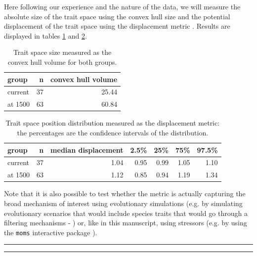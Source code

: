 \documentclass[12pt,letterpaper]{article}
\begin{document}
Here following our experience and the nature of the data, we will measure the absolute size of the trait space using the convex hull size and the potential displacement of the trait space using the displacement metric \citep{guillerme2020shifting}.
Results are displayed in tables \ref{Tab:results_convhull} and \ref{Tab:displacement}.

\begin{table}[ht]
\centering
\begin{tabular}{lrr}
  \hline
 group & n & convex hull volume \\ 
  \hline
 current &  37 & 25.44 \\ 
 at 1500 &  63 & 60.84 \\ 
   \hline
\end{tabular}
\caption{Trait space size measured as the convex hull volume for both groups.}
\label{Tab:results_convhull}
\end{table}

\begin{table}[ht]
\centering
\begin{tabular}{lrrrrrr}
  \hline
 group & n & median displacement & 2.5\% & 25\% & 75\% & 97.5\% \\ 
  \hline
 current &  37 & 1.04 & 0.95 & 0.99 & 1.05 & 1.10 \\ 
 at 1500 &  63 & 1.12 & 0.85 & 0.94 & 1.19 & 1.34 \\ 
   \hline
\end{tabular}
\caption{Trait space position distribution measured as the displacement metric: the percentages are the confidence intervals of the distribution.}
\label{Tab:displacement}
\end{table}

Note that it is also possible to test whether the metric is actually capturing the broad mechanism of interest using evolutionary simulations (e.g. by simulating evolutionary scenarios that would include species traits that would go through a filtering mechanisms - \citealt{guillerme2024treats}) or, like in this manuscript, using stressors (e.g. by using the \texttt{moms} interactive package \citealt{guillerme2020shifting}).


\bigskip
\bigskip
\hrule
\hrule
\end{document}
